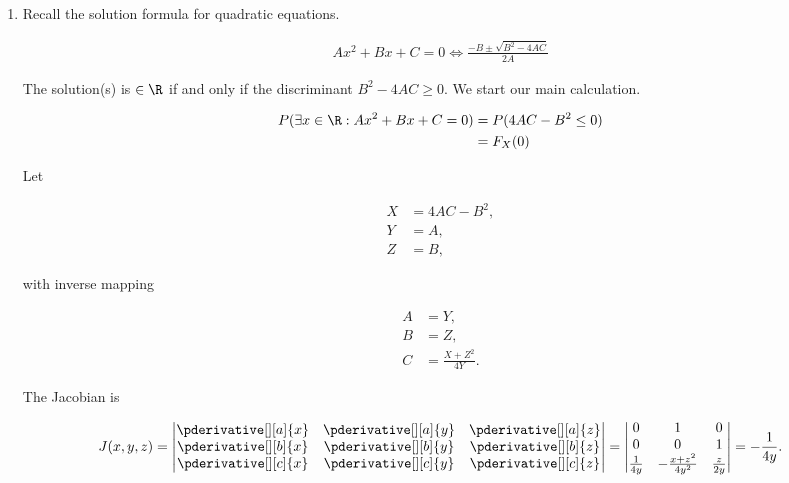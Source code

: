 \begin{solution}

\phantom{}

\begin{enumerate}[label = (\alph*)]

    \item Recall the solution formula for quadratic equations.
    
    \begin{align*}
        A x^2 + B x + C = 0
        \iff
        \frac
        {
            -B \pm \sqrt{B^2 - 4 A C}
        }{
            2 A
        }
    \end{align*}
    
    The solution(s) is $\in \R$ if and only if the discriminant $B^2 - 4 A C \geq 0$.
    We start our main calculation.

    \begin{align*}
        P(\exists x \in \R: A x^2 + B x + C = 0)
        & =
        P(4 A C - B^2 \leq 0) \\
        & =
        F_X(0)
    \end{align*}

    Let

    \begin{align*}
        X & = 4 A C - B^2, \\
        Y & = A, \\
        Z & = B,
    \end{align*}
    
    with inverse mapping
    
    \begin{align*}
        A & = Y, \\
        B & = Z, \\
        C & = \frac{X + Z^2}{4 Y}.
    \end{align*}
    
    The Jacobian is
    
    \begin{align*}
        J(x, y, z)
        =
        \begin{vmatrix}
            \pderivative[][a]{x} & \pderivative[][a]{y} & \pderivative[][a]{z} \\
            \pderivative[][b]{x} & \pderivative[][b]{y} & \pderivative[][b]{z} \\
            \pderivative[][c]{x} & \pderivative[][c]{y} & \pderivative[][c]{z} \\
        \end{vmatrix}
        =
        \begin{vmatrix}
            0 & 1 & 0 \\
            0 & 0 & 1 \\
            \frac{1}{4 y} & -\frac{x + z^2}{4 y^2} & \frac{z}{2 y}
        \end{vmatrix}
        =
        -\frac{1}{4 y}.
    \end{align*}
    

\end{enumerate}
\end{solution}
